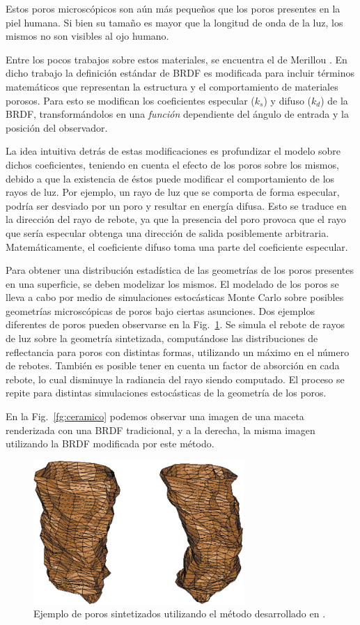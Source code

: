 Estos poros microscópicos son aún más pequeños que los poros presentes en la piel humana.
Si bien su tamaño es mayor que la longitud de onda de la luz, los mismos no son visibles al ojo humano.

Entre los pocos trabajos sobre estos materiales, se encuentra el de Merillou \cite{Merillou2000}.
En dicho trabajo la definición estándar de BRDF es modificada para incluir términos matemáticos que representan la estructura y el comportamiento de materiales porosos.
Para esto se modifican los coeficientes especular ($k_{s}$) y difuso ($k_{d}$) de la BRDF, transformándolos en una {\em función} dependiente del ángulo de entrada y la posición del observador.

La idea intuitiva detrás de estas modificaciones es profundizar el modelo sobre dichos coeficientes, teniendo en cuenta el efecto de los poros sobre los mismos, debido a que la existencia de éstos puede modificar el comportamiento de los rayos de luz.
Por ejemplo, un rayo de luz que se comporta de forma especular, podría ser desviado por un poro y resultar en energía difusa.
Esto se traduce en la dirección del rayo de rebote, ya que la presencia del poro provoca que el rayo que sería especular obtenga una dirección de salida posiblemente arbitraria.
Matemáticamente, el coeficiente difuso toma una parte del coeficiente especular.

Para obtener una distribución estadística de las geometrías de los poros presentes en una superficie, se deben modelizar los mismos.
El modelado de los poros se lleva a cabo por medio de simulaciones estocásticas Monte Carlo sobre posibles geometrías microscópicas de poros bajo ciertas asunciones.
Dos ejemplos diferentes de poros pueden observarse en la Fig.~\ref{fg:poro}.
Se simula el rebote de rayos de luz sobre la geometría sintetizada, computándose las distribuciones de reflectancia para poros con distintas formas, utilizando un máximo en el número de rebotes.
También es posible tener en cuenta un factor de absorción en cada rebote, lo cual disminuye la radiancia del rayo siendo computado.
El proceso se repite para distintas simulaciones estocásticas de la geometría de los poros.


En la Fig.~\ref{fg:ceramico} podemos observar una imagen de una maceta renderizada con una BRDF tradicional, y a la derecha, la misma imagen utilizando la BRDF modificada por este método.

\begin{figure}
\center
\includegraphics[width=8cm]{figures/poro}
\caption[Poros sinterizados]{Ejemplo de poros sintetizados utilizando el método desarrollado en \cite{Merillou2000}.}
\label{fg:poro}
\end{figure}

